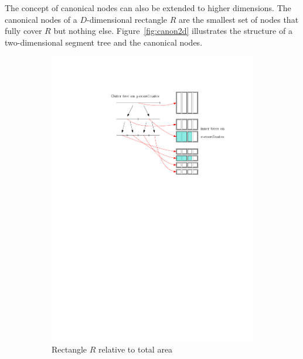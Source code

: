 \documentclass[english,gradu]{tktltiki2018}
\begin{document}
The concept of canonical nodes can also be extended to higher dimensions.
The canonical nodes  of a $D$-dimensional rectangle $R$ are the smallest set of nodes that fully cover $R$ but nothing else.
Figure~\ref{fig:canon2d} illustrates the structure of a two-dimensional segment tree and the canonical nodes.

\begin{figure}\centering
	\begin{subfigure}[t]{0.15\textwidth}\centering
		\includegraphics[width=\textwidth,page=2]{fig/segtree2d}
		\caption{Rectangle $R$ relative to total area}\label{fig:canon2d:r}
	\end{subfigure}
	\hfil
	\begin{subfigure}[t]{0.75\textwidth}\centering

\end{subfigure}
\end{figure}
\end{document}
